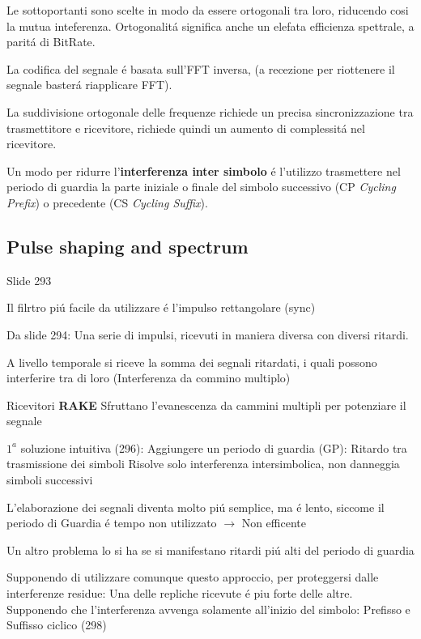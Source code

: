 \documentclass{article}
\begin{document}
Le sottoportanti sono scelte in modo da essere ortogonali tra loro, riducendo cosi la mutua inteferenza.
Ortogonalit\'a significa anche un elefata efficienza spettrale, a parit\'a di BitRate.

La codifica del segnale \'e basata sull'FFT inversa, (a recezione per riottenere il segnale baster\'a riapplicare FFT).

La suddivisione ortogonale delle frequenze richiede un precisa sincronizzazione tra trasmettitore e ricevitore, richiede quindi un aumento di complessit\'a nel ricevitore.

Un modo per ridurre l'\textbf{interferenza inter simbolo} \'e l'utilizzo trasmettere nel periodo di guardia la parte iniziale o finale del simbolo successivo (CP \textit{Cycling Prefix}) o precedente (CS \textit{Cycling Suffix}).
\subsection{Pulse shaping and spectrum}
Slide 293


Il filrtro pi\'u facile da utilizzare \'e l'impulso rettangolare (sync)

Da slide 294: Una serie di impulsi, ricevuti in maniera diversa con diversi ritardi.

A livello temporale si riceve la somma dei segnali ritardati, i quali possono interferire tra di loro (Interferenza da commino multiplo)

Ricevitori \textbf{RAKE} Sfruttano l'evanescenza da cammini multipli per potenziare il segnale

$1^a$ soluzione intuitiva (296): Aggiungere un periodo di guardia (GP): Ritardo tra trasmissione dei simboli
Risolve solo interferenza intersimbolica, non danneggia simboli successivi

L'elaborazione dei segnali diventa molto pi\'u semplice, ma \'e lento, siccome il periodo di Guardia \'e tempo non utilizzato $\rightarrow$ Non efficente

Un altro problema lo si ha se si manifestano ritardi pi\'u alti del periodo di guardia


Supponendo di utilizzare comunque questo approccio, per proteggersi dalle interferenze residue: Una delle repliche ricevute \'e piu forte delle altre. Supponendo che l'interferenza avvenga solamente all'inizio del simbolo: Prefisso e Suffisso ciclico (298)
\end{document}
